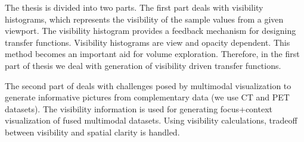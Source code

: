 The thesis is divided into two parts. The first part deals with visibility histograms, which represents the visibility of the sample values from a given viewport. The visibility histogram provides a feedback mechanism for designing transfer functions. Visibility histograms are view and opacity dependent. This method becomes an important aid for volume exploration. Therefore, in the first part of thesis we deal with generation of visibility driven transfer functions. 

The second part of deals with challenges posed by multimodal visualization to generate informative pictures from complementary data (we use CT and PET datasets). The visibility information is used for generating focus+context visualization of fused multimodal datasets. Using visibility calculations, tradeoff between visibility and spatial clarity is handled. 




